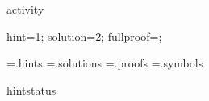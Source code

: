 
\def\case#1{\noindent\casestylize{#1}}
\def\proofpart#1{\noindent\proofpartstylize{#1}}
\def\crcase#1{\endgraf\case{#1}}
\def\crproofpart#1{\endgraf\proofpart{#1}}
\def\crtabcase#1{\endgraf\indent\case{#1}}
\def\crtabproofpart#1{\endgraf\indent\proofpart{#1}}
\def\proofalt#1{\noindent\proofaltstylize{#1}}
\def\crproofalt#1{\endgraf\proofalt{#1}}
\def\crtabproofalt#1{\endgraf\indent\proofalt{#1}}
\def\mistake{\hfill\mistakesymbol}%




\DefStyle activity     {\rm}

\def\activitysymbol{\raise.4ex\hbox{$\scriptscriptstyle\blacktriangleright$}}
\def\qedsymbol{\vrule width .3em height 1.8ex depth .1ex\relax} %
\def\qecsymbol{\vrule width .3em height 1.8ex depth .1ex\relax} %
\def\qessymbol{\boxit{0pt}{\phantom{\qedsymbol}}} %
\def\qexsymbol{\ensuremath{\bullet}} %
\def\qepsymbol{\ensuremath{\fatsemi}} %
\def\mistakesymbol{\ensuremath{\lightning}}
\def\qedword{{\scshape οεδ}}
\def\qecword{{\scshape οεπ}}
\def\qesword{{\scshape οες}}
\def\qedof#1.{\hfill\qedsymbol~(#1)} %


\Newskip hint=1\baselineskip;
\Newskip solution=2\hintskipamount;
\Newskip fullproof=\solutionskipamount;

\newwrite\hintsfile
\newwrite\solutionsfile
\newwrite\fullproofsfile
\newwrite\symbolsfile
\immediate\openout\hintsfile=\jobname.hints
\immediate\openout\solutionsfile=\jobname.solutions
\immediate\openout\fullproofsfile=\jobname.proofs
\immediate\openout\symbolsfile=\jobname.symbols



\DefStyle hintstatus   {\color{hintstatuscolor}\sixrm}

\def\rhanghintstatus#1{\rlap{\raise.125ex\hbox{\hintstatusstylize{(\thinspace\structtag\thinspace \hinttagdecorator\thinspace#1)}}}}

\def\writesymbol#1#2#3#4{%
\immediate\write\symbolsfile{%
\ea\string\csname symbolentry\endcsname
    {#1}
    {#2}
    {#3}
    {#4}
}%
}

